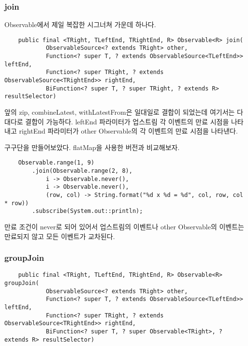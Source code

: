 \documentclass{book}
\begin{document}
{\subsubsection{join}
Observable에서 제일 복잡한 시그너쳐 가운데 하나다. 
\begin{verbatim}
    public final <TRight, TLeftEnd, TRightEnd, R> Observable<R> join(
            ObservableSource<? extends TRight> other,
            Function<? super T, ? extends ObservableSource<TLeftEnd>> leftEnd,
            Function<? super TRight, ? extends ObservableSource<TRightEnd>> rightEnd,
            BiFunction<? super T, ? super TRight, ? extends R> resultSelector)
\end{verbatim}
앞의 zip, combineLatest, withLatestFrom은 일대일로 결합이 되었는데 여기서는 다대다로 결합이 가능하다.
leftEnd 파라미터가 업스트림 각 이벤트의 만료 시점을 나타내고 rightEnd 파라미터가 other Observable의 각 이벤트의 만료 시점을 나타낸다.

구구단을 만들어보았다. flatMap을 사용한 버전과 비교해보자.
\begin{verbatim}
    Observable.range(1, 9)
        .join(Observable.range(2, 8),
            i -> Observable.never(),
            i -> Observable.never(),
            (row, col) -> String.format("%d x %d = %d", col, row, col * row))
        .subscribe(System.out::println);
\end{verbatim}
만료 조건이 never로 되어 있어서 업스트림의 이벤트나 other Observable의 이벤트는 만료되지 않고 모든 이벤트가 교차된다.

\subsubsection{groupJoin}

\begin{verbatim}
    public final <TRight, TLeftEnd, TRightEnd, R> Observable<R> groupJoin(
            ObservableSource<? extends TRight> other,
            Function<? super T, ? extends ObservableSource<TLeftEnd>> leftEnd,
            Function<? super TRight, ? extends ObservableSource<TRightEnd>> rightEnd,
            BiFunction<? super T, ? super Observable<TRight>, ? extends R> resultSelector) 
\end{verbatim}
}
\end{document}
